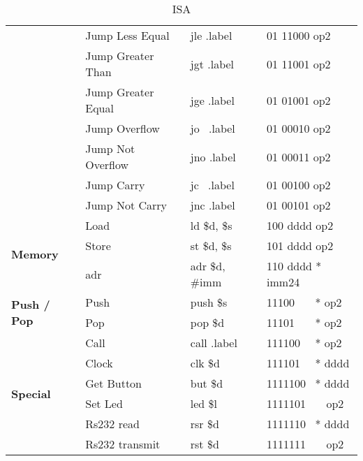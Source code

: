 \begin{table}[H]
{\begin{tabular}{|p{2cm}|l|l|l|}
 & Jump Less Equal & jle .label & 01 11000 op2 \\ \cline{ 2- 4}
 & Jump Greater Than & jgt .label & 01 11001 op2 \\ \cline{ 2- 4}
 & Jump Greater Equal & jge .label & 01 01001 op2 \\ \cline{ 2- 4}
 & Jump Overflow & jo \ .label & 01 00010 op2 \\ \cline{ 2- 4}
 & Jump Not Overflow & jno .label & 01 00011 op2 \\ \cline{ 2- 4}
 & Jump Carry & jc \ .label & 01 00100 op2 \\ \cline{ 2- 4}
 & Jump Not Carry & jnc .label & 01 00101 op2 \\ \hline
\multirow{3}{*}{\textbf{Memory}} & Load & ld \$d, \$s & 100 dddd op2 \\ \cline{ 2- 4}
 & Store & st \$d, \$s & 101 dddd op2 \\ \cline{ 2- 4}
 & adr & adr \$d, \#imm & 110 dddd * imm24 \\ \hline
\multirow{2}{*}{\parbox{2cm}{\textbf{Push / Pop}}} & Push & push \$s & 11100 \ \ \ * op2 \\ \cline{ 2- 4}
 & Pop & pop \$d & 11101 \ \ \ * op2 \\ \hline
\multirow{6}{*}{\textbf{Special}} & Call & call .label & 111100 \ \ * op2 \\ \cline{ 2- 4}
 & Clock & clk \$d & 111101 \ \ * dddd \\ \cline{ 2- 4}
 & Get Button & but \$d & 1111100 \ * dddd \\ \cline{ 2- 4}
 & Set Led & led \$l & 1111101 \ \ \ op2 \\ \cline{ 2- 4}
 & Rs232 read & rsr \$d & 1111110 \ * dddd \\ \cline{ 2- 4}
 & Rs232 transmit & rst \$d & 1111111 \ \ \ op2 \\ \hline
\end{tabular}
}
\caption{ISA}
\label{AP:ISA}
\end{table}